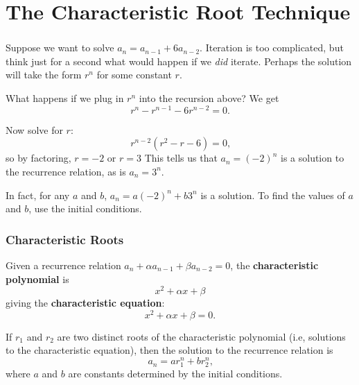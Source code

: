 \documentclass[11pt, compress]{beamer}
\newcommand{\terminology}[1]{\textbf{#1}}
\begin{document}
\section{The Characteristic Root Technique}
\begin{frame}
\frametitle{}
Suppose we want to solve  \(a_n = a_{n-1} + 6a_{n-2}\). Iteration is too complicated, but think just for a second what would happen if we \emph{did} iterate. Perhaps the solution will take the form \(r^n\) for some constant \(r\).
 
\pause \vfill 

What happens if we plug in \(r^n\) into the recursion above? We get%
\begin{equation*}
r^n - r^{n-1} - 6r^{n-2} = 0\text{.}
\end{equation*}

 
\pause \vfill 

Now solve for \(r\):%
\begin{equation*}
r^{n-2}(r^2 - r - 6) = 0\text{,}
\end{equation*}
so by factoring, \(r = -2\) or \(r = 3\) This tells us that \(a_n = (-2)^n\) is a solution to the recurrence relation, as is \(a_n = 3^n\).
 
\pause \vfill 

In fact, for any \(a\) and \(b\), \(a_n = a(-2)^n + b 3^n\) is a solution. To find the values of \(a\) and \(b\), use the initial conditions.
\end{frame}
 
\begin{frame}
\frametitle{Characteristic Roots}
 Given a recurrence relation \(a_n + \alpha a_{n-1} + \beta a_{n-2} = 0\), the \terminology{characteristic polynomial} is%
\begin{equation*}
x^2 + \alpha x + \beta
\end{equation*}
giving the \terminology{characteristic equation}:%
\begin{equation*}
x^2 + \alpha x + \beta = 0\text{.}
\end{equation*}

 
\pause \vfill 

If \(r_1\) and \(r_2\) are two distinct roots of the characteristic polynomial (i.e, solutions to the characteristic equation), then the solution to the recurrence relation is%
\begin{equation*}
a_n = ar_1^n + br_2^n\text{,}
\end{equation*}
where \(a\) and \(b\) are constants determined by the initial conditions.
\end{frame}
 
\end{document}
